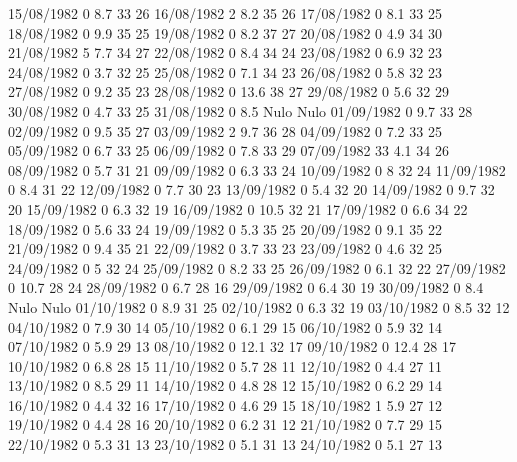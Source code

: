 15/08/1982  0      8.7    33     26 
16/08/1982  2      8.2    35     26 
17/08/1982  0      8.1    33     25 
18/08/1982  0      9.9    35     25 
19/08/1982  0      8.2    37     27 
20/08/1982  0      4.9    34     30 
21/08/1982  5      7.7    34     27 
22/08/1982  0      8.4    34     24 
23/08/1982  0      6.9    32     23 
24/08/1982  0      3.7    32     25 
25/08/1982  0      7.1    34     23 
26/08/1982  0      5.8    32     23 
27/08/1982  0      9.2    35     23 
28/08/1982  0      13.6   38     27 
29/08/1982  0      5.6    32     29 
30/08/1982  0      4.7    33     25 
31/08/1982  0      8.5   Nulo   Nulo
01/09/1982  0      9.7    33     28 
02/09/1982  0      9.5    35     27 
03/09/1982  2      9.7    36     28 
04/09/1982  0      7.2    33     25 
05/09/1982  0      6.7    33     25 
06/09/1982  0      7.8    33     29 
07/09/1982  33     4.1    34     26 
08/09/1982  0      5.7    31     21 
09/09/1982  0      6.3    33     24 
10/09/1982  0      8      32     24 
11/09/1982  0      8.4    31     22 
12/09/1982  0      7.7    30     23 
13/09/1982  0      5.4    32     20 
14/09/1982  0      9.7    32     20 
15/09/1982  0      6.3    32     19 
16/09/1982  0      10.5   32     21 
17/09/1982  0      6.6    34     22 
18/09/1982  0      5.6    33     24 
19/09/1982  0      5.3    35     25 
20/09/1982  0      9.1    35     22 
21/09/1982  0      9.4    35     21 
22/09/1982  0      3.7    33     23 
23/09/1982  0      4.6    32     25 
24/09/1982  0      5      32     24 
25/09/1982  0      8.2    33     25 
26/09/1982  0      6.1    32     22 
27/09/1982  0      10.7   28     24 
28/09/1982  0      6.7    28     16 
29/09/1982  0      6.4    30     19 
30/09/1982  0      8.4   Nulo   Nulo
01/10/1982  0      8.9    31     25 
02/10/1982  0      6.3    32     19 
03/10/1982  0      8.5    32     12 
04/10/1982  0      7.9    30     14 
05/10/1982  0      6.1    29     15 
06/10/1982  0      5.9    32     14 
07/10/1982  0      5.9    29     13 
08/10/1982  0      12.1   32     17 
09/10/1982  0      12.4   28     17 
10/10/1982  0      6.8    28     15 
11/10/1982  0      5.7    28     11 
12/10/1982  0      4.4    27     11 
13/10/1982  0      8.5    29     11 
14/10/1982  0      4.8    28     12 
15/10/1982  0      6.2    29     14 
16/10/1982  0      4.4    32     16 
17/10/1982  0      4.6    29     15 
18/10/1982  1      5.9    27     12 
19/10/1982  0      4.4    28     16 
20/10/1982  0      6.2    31     12 
21/10/1982  0      7.7    29     15 
22/10/1982  0      5.3    31     13 
23/10/1982  0      5.1    31     13 
24/10/1982  0      5.1    27     13 
